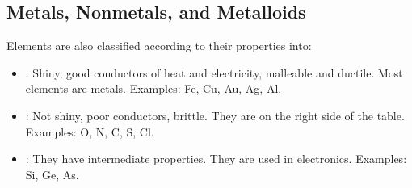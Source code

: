 \subsection{Metals, Nonmetals, and Metalloids}
Elements are also classified according to their properties into:
\begin{itemize}
    \item {}: Shiny, good conductors of heat and electricity, malleable and ductile. Most elements are metals. Examples: Fe, Cu, Au, Ag, Al.
    \item {}: Not shiny, poor conductors, brittle. They are on the right side of the table. Examples: O, N, C, S, Cl.
    \item {}: They have intermediate properties. They are used in electronics. Examples: Si, Ge, As.
\end{itemize}
